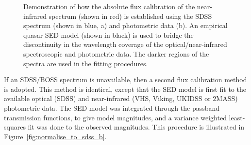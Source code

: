 \begin{figure}
    \captionsetup[subfigure]{labelformat=empty}
    \centering
    \subfloat[\label{fig:normalise_to_sdss_a}]{}
    \subfloat[\label{fig:normalise_to_sdss_b}]{}    
    \caption[{}]{Demonstration of how the absolute flux calibration of the near-infrared spectrum (shown in red) is established using the SDSS spectrum (shown in blue, a) and photometric data (b). An empirical quasar SED model (shown in black) is used to bridge the discontinuity in the wavelength coverage of the optical/near-infrared spectroscopic and photometric data. The darker regions of the spectra are used in the fitting procedures.}     
    \label{fig:normalise_to_sdss}
\end{figure}

If an SDSS/BOSS spectrum is unavailable, then a second flux calibration method is adopted. 
This method is identical, except that the SED model is first fit to the available optical (SDSS) and near-infrared (VHS, Viking, UKIDSS or $2$MASS) photometric data. 
The SED model was integrated through the passband transmission functions, to give model magnitudes, and a variance weighted least-squares fit was done to the observed magnitudes. 
This procedure is illustrated in Figure~\ref{fig:normalise_to_sdss_b}. 


